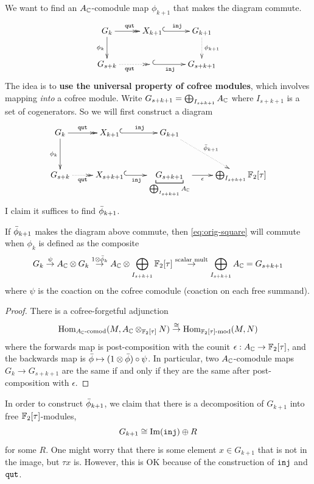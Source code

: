 \documentclass[11pt]{amsart}
\begin{document}
We want to find an $A_{\mathbb{C}}$-comodule map $\phi_{k+1}$ that makes the diagram
commute.
\begin{equation}\label{eq:orig-square} \xymatrix{
G_k\ar@{->>}[r]^\qut\ar[d]_-{\phi_k} & X_{k+1}\ar@{^(->}[r]^-{\inj} & G_{k+1}\ar@{.>}[d]^-{\phi_{k+1}}
\\G_{s+k}\ar@{.>>}[r]_\qut & \ar@{^(->}[r]_-{\inj} & G_{s+k+1}
}\end{equation}
The idea is to \textbf{use the universal property of cofree modules}, which
involves mapping \emph{into} a cofree module. Write $G_{s+k+1}= \bigoplus_{I_{s+k+1}} A_{\mathbb{C}}$
where $I_{s+k+1}$ is a set of cogenerators.
So we will first construct a
diagram
$$ \xymatrix{
G_k\ar@{->>}[r]^-\qut\ar[d]_-{\phi_k} & X_{k+1}\ar@{^(->}[r]^-{\inj} &
G_{k+1}\ar@{.>}[rd]^-{\phibar_{k+1}}
\\G_{s+k}\ar@{.>>}[r]_-\qut & X_{s+k+1}\ar@{^(->}[r]_-{\inj} &
\u{G_{s+k+1}}_{\dsums_{I_{s+k+1}} A_\C}
\ar[r]_-\epsilon &  \dsums_{I_{s+k+1}} \F_2[\tau]
}$$
I claim it suffices to find $\bar{\phi}_{k+1}$.

\begin{lemma}
If $\bar{\phi}_{k+1}$ makes the diagram above commute, then \eqref{eq:orig-square}
will commute when $\phi_k$ is defined as the composite
$$ G_k \overset{\psi}\to A_{\mathbb{C}} \otimes G_k \overset{1\otimes \bar{\phi}_k}\to A_{\mathbb{C}}\otimes
\bigoplus_{I_{s+k+1}} \mathbb{F}_2[\tau] \overset{\text{scalar mult}}\to \bigoplus_{I_{s+k+1}}A_{\mathbb{C}} =
G_{s+k+1}$$
where $\psi$ is the coaction on the cofree comodule
(coaction on each free summand).
\end{lemma}
\begin{proof}
There is a cofree-forgetful adjunction
$$ \operatorname{Hom}_{A_{\mathbb{C}}\text{-comod}}(M, A_{\mathbb{C}}\otimes_{\mathbb{F}_2[\tau]} N) \overset{\cong}\to\operatorname{Hom}_{\mathbb{F}_2[\tau]\text{-mod}}(M,N) $$
where the forwards map is post-composition with the counit $\epsilon:A_{\mathbb{C}}\to
\mathbb{F}_2[\tau]$, and the backwards map is $\bar{\phi} \mapsto (1\otimes \bar{\phi})\circ
\psi$. In particular, two $A_{\mathbb{C}}$-comodule maps $G_k\to G_{s+k+1}$ are the same if and only if
they are the same after post-composition with $\epsilon$.
\end{proof}

In order to construct $\bar{\phi}_{k+1}$, we claim that there is a decomposition of
$G_{k+1}$ into free $\mathbb{F}_2[\tau]$-modules,
$$ G_{k+1} \cong \operatorname{Im}(\mathtt{inj}) \oplus R $$
for some $R$. One might worry that there is some element $x\in
G_{k+1}$ that is not in the image, but $\tau x$ is. However, this is OK because
of the construction of $\mathtt{inj}$ and $\mathtt{qut}$.
\end{document}

